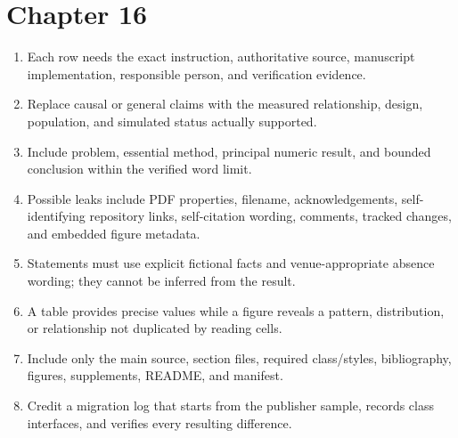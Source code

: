 \section*{Chapter 16}
\begin{enumerate}[label=16.\arabic*,leftmargin=2.4em,itemsep=0.45em]
  \item Each row needs the exact instruction, authoritative source, manuscript
        implementation, responsible person, and verification evidence.
  \item Replace causal or general claims with the measured relationship, design,
        population, and simulated status actually supported.
  \item Include problem, essential method, principal numeric result, and bounded
        conclusion within the verified word limit.
  \item Possible leaks include PDF properties, filename, acknowledgements,
        self-identifying repository links, self-citation wording, comments,
        tracked changes, and embedded figure metadata.
  \item Statements must use explicit fictional facts and venue-appropriate
        absence wording; they cannot be inferred from the result.
  \item A table provides precise values while a figure reveals a pattern,
        distribution, or relationship not duplicated by reading cells.
  \item Include only the main source, section files, required class/styles,
        bibliography, figures, supplements, README, and manifest.
  \item Credit a migration log that starts from the publisher sample, records
        class interfaces, and verifies every resulting difference.
\end{enumerate}


